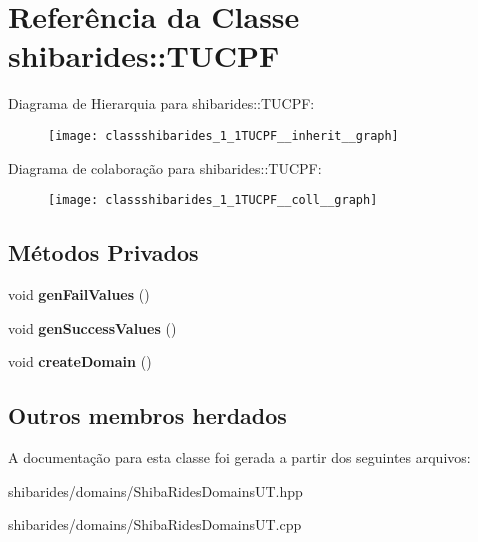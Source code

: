 \hypertarget{classshibarides_1_1TUCPF}{}\section{Referência da Classe shibarides\+:\+:T\+U\+C\+PF}
\label{classshibarides_1_1TUCPF}


Diagrama de Hierarquia para shibarides\+:\+:T\+U\+C\+PF\+:\nopagebreak
\begin{figure}[H]
\begin{center}
\leavevmode
\texttt{[image: classshibarides\_1\_1TUCPF\_\_inherit\_\_graph]}
\end{center}
\end{figure}


Diagrama de colaboração para shibarides\+:\+:T\+U\+C\+PF\+:\nopagebreak
\begin{figure}[H]
\begin{center}
\leavevmode
\texttt{[image: classshibarides\_1\_1TUCPF\_\_coll\_\_graph]}
\end{center}
\end{figure}
\subsection*{Métodos Privados}
\begin{DoxyCompactItemize}
\item 
void {\bfseries gen\+Fail\+Values} ()\hypertarget{classshibarides_1_1TUCPF_a3cf74c1e8f7234dbe8735d82b79437f7}{}\label{classshibarides_1_1TUCPF_a3cf74c1e8f7234dbe8735d82b79437f7}

\item 
void {\bfseries gen\+Success\+Values} ()\hypertarget{classshibarides_1_1TUCPF_a1a8eb44e696ac200af8e6f5a35226ec0}{}\label{classshibarides_1_1TUCPF_a1a8eb44e696ac200af8e6f5a35226ec0}

\item 
void {\bfseries create\+Domain} ()\hypertarget{classshibarides_1_1TUCPF_a264f35c85b0b257ad62e913db84359f0}{}\label{classshibarides_1_1TUCPF_a264f35c85b0b257ad62e913db84359f0}

\end{DoxyCompactItemize}
\subsection*{Outros membros herdados}


A documentação para esta classe foi gerada a partir dos seguintes arquivos\+:\begin{DoxyCompactItemize}
\item 
shibarides/domains/Shiba\+Rides\+Domains\+U\+T.\+hpp\item 
shibarides/domains/Shiba\+Rides\+Domains\+U\+T.\+cpp\end{DoxyCompactItemize}

